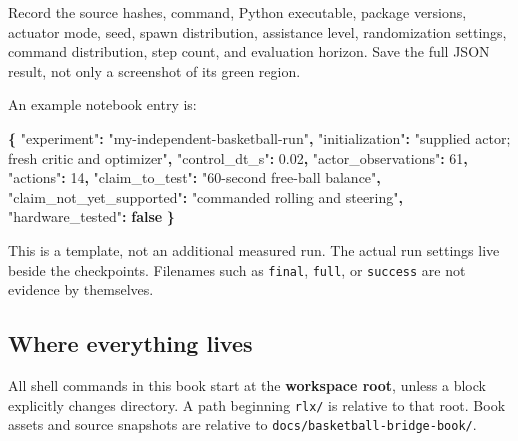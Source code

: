\documentclass[
  american,
  11pt,
  letterpaper,
]{article}
\newenvironment{Shaded}{\begin{snugshade}}{\end{snugshade}}
\newcommand{\DataTypeTok}[1]{\textcolor[rgb]{0.13,0.29,0.53}{#1}}
\newcommand{\DecValTok}[1]{\textcolor[rgb]{0.00,0.00,0.81}{#1}}
\newcommand{\FloatTok}[1]{\textcolor[rgb]{0.00,0.00,0.81}{#1}}
\newcommand{\FunctionTok}[1]{\textcolor[rgb]{0.13,0.29,0.53}{\textbf{#1}}}
\newcommand{\KeywordTok}[1]{\textcolor[rgb]{0.13,0.29,0.53}{\textbf{#1}}}
\newcommand{\StringTok}[1]{\textcolor[rgb]{0.31,0.60,0.02}{#1}}
\renewenvironment{Shaded}{\par\smallskip}{\par\smallskip}
\begin{document}
Record the source hashes, command, Python executable, package versions,
actuator mode, seed, spawn distribution, assistance level, randomization
settings, command distribution, step count, and evaluation horizon. Save
the full JSON result, not only a screenshot of its green region.

An example notebook entry is:

\begin{Shaded}
\begin{Highlighting}[]
\FunctionTok{\{}
  \DataTypeTok{"experiment"}\FunctionTok{:} \StringTok{"my{-}independent{-}basketball{-}run"}\FunctionTok{,}
  \DataTypeTok{"initialization"}\FunctionTok{:} \StringTok{"supplied actor; fresh critic and optimizer"}\FunctionTok{,}
  \DataTypeTok{"control\_dt\_s"}\FunctionTok{:} \FloatTok{0.02}\FunctionTok{,}
  \DataTypeTok{"actor\_observations"}\FunctionTok{:} \DecValTok{61}\FunctionTok{,}
  \DataTypeTok{"actions"}\FunctionTok{:} \DecValTok{14}\FunctionTok{,}
  \DataTypeTok{"claim\_to\_test"}\FunctionTok{:} \StringTok{"60{-}second free{-}ball balance"}\FunctionTok{,}
  \DataTypeTok{"claim\_not\_yet\_supported"}\FunctionTok{:} \StringTok{"commanded rolling and steering"}\FunctionTok{,}
  \DataTypeTok{"hardware\_tested"}\FunctionTok{:} \KeywordTok{false}
\FunctionTok{\}}
\end{Highlighting}
\end{Shaded}

This is a template, not an additional measured run. The actual run
settings live beside the checkpoints. Filenames such as \texttt{final},
\texttt{full}, or \texttt{success} are not evidence by themselves.

\subsection{Where everything lives}\label{where-everything-lives}

All shell commands in this book start at the \textbf{workspace root},
unless a block explicitly changes directory. A path beginning
\texttt{rlx/} is relative to that root. Book assets and source snapshots
are relative to
\texttt{docs/\allowbreak{}basketba\allowbreak{}ll-\allowbreak{}bridge-\allowbreak{}book/\allowbreak{}}.
\end{document}
